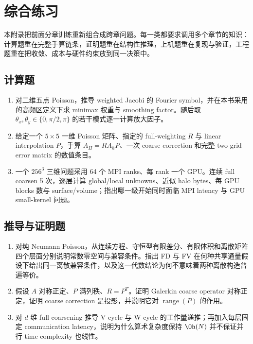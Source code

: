 \chapter{综合练习}
\label{app:exercises}

\begin{keybox}
本附录把前面分章训练重新组合成跨章问题。每一类都要求调用多个章节的知识：计算题重在完整手算链条，证明题重在结构性推理，上机题重在复现与验证，工程题重在把收敛、成本与硬件约束放到同一决策中。
\end{keybox}

\section*{计算题}
\begin{enumerate}
\item 对二维五点 Poisson，推导 weighted Jacobi 的 Fourier symbol，并在本书采用的高频区定义下求 minimax 权重与 smoothing factor。随后取 $\theta_x,\theta_y\in\{0,\pi/2,\pi\}$ 的若干模式逐一计算放大因子。
\item 给定一个 $5\times5$ 一维 Poisson 矩阵、指定的 full-weighting $R$ 与 linear interpolation $P$，手算 $A_H=RA_hP$、一次 coarse correction 和完整 two-grid error matrix 的数值条目。
\item 一个 $256^3$ 三维问题采用 64 个 MPI ranks、每 rank 一个 GPU。连续 full coarsen 5 次，逐层计算 global/local unknowns、近似 halo bytes、每 GPU blocks 数与 surface/volume；指出哪一级开始同时面临 MPI latency 与 GPU small-kernel 问题。
\end{enumerate}

\section*{推导与证明题}
\begin{enumerate}
\item 对纯 Neumann Poisson，从连续方程、守恒型有限差分、有限体积和离散矩阵四个层面分别说明常数零空间与兼容条件。指出 FD 与 FV 在何种共享通量假设下给出同一离散兼容条件，以及这一代数结论为何不意味着两种离散构造普遍等价。
\item 假设 $A$ 对称正定、$P$ 满列秩、$R=P^T$。证明 Galerkin coarse operator 对称正定，证明 coarse correction 是投影，并说明它对 $\operatorname{range}(P)$ 的作用。
\item 对 $d$ 维 full coarsening 推导 V-cycle 与 W-cycle 的工作量递推；再加入每层固定 communication latency，说明为什么算术复杂度保持 $\Oh(N)$ 并不保证并行 time complexity 也线性。
\end{enumerate}

